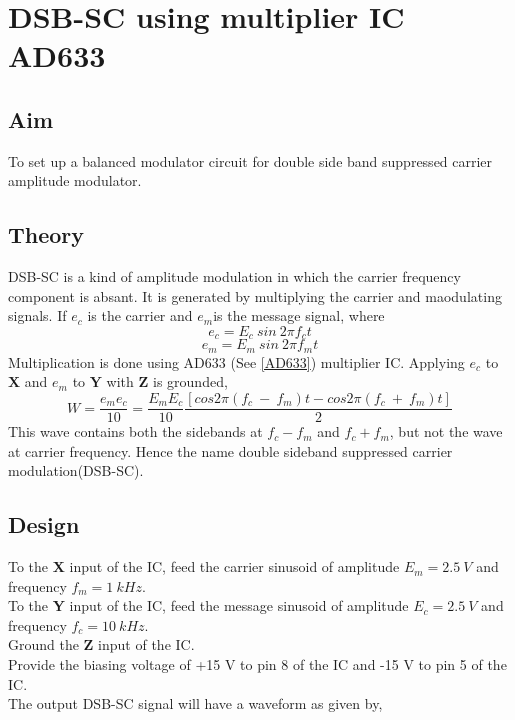 \chapter[DSB-SC using multiplier IC AD633]{DSB-SC using multiplier IC AD633}
\label{chapdsbsc}
\section*{Aim}
To set up a balanced modulator circuit for double side band suppressed carrier amplitude modulator.
\section*{Theory}
DSB-SC is a kind of amplitude modulation in which the carrier frequency component is absant. It is generated by multiplying the carrier and maodulating signals. If $e_c$ is the carrier and $e_m$is the message signal, where
\begin{equation}
e_c=E_c\  sin\ 2\pi f_ct
\end{equation}
\begin{equation}
e_m=E_m\  sin\ 2\pi f_mt
\end{equation}
Multiplication is done using AD633 (See \ref{AD633}) multiplier IC.
Applying $e_c$ to $\textbf{X}$ and $e_m$ to $\textbf{Y}$ with $\textbf{Z}$ is grounded, 
\begin{equation}
W= \frac{e_me_c}{10} = \frac{E_mE_c}{10} \frac{[cos 2\pi (f_c\ -\ f_m)t-cos 2\pi (f_c\ +\ f_m)t]}{2}
\end{equation}
This wave contains both the sidebands at $f_c-f_m$ and $f_c+f_m$, but not the wave at carrier frequency. Hence the name double sideband suppressed carrier modulation(DSB-SC).
\section*{Design}

To the \textbf{X} input of the IC, feed the carrier sinusoid of amplitude $E_m=2.5\ V$ and frequency $f_m= 1\ kHz$.\\
To the \textbf{Y} input of the IC, feed the message sinusoid of amplitude $E_c=2.5\ V$ and frequency $f_c= 10\ kHz$.\\
Ground the \textbf{Z} input of the IC.\\
Provide the biasing voltage of +15 V to pin 8 of the IC and -15 V to pin 5 of the IC.\\

The output DSB-SC signal will have a waveform as given by,


